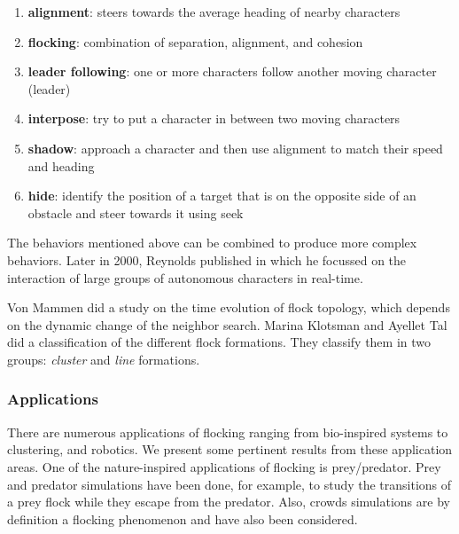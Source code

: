 \begin{enumerate}
\item \textbf{alignment}: steers towards the average heading of nearby characters
\item \textbf{flocking}: combination of separation, alignment, and cohesion
\item \textbf{leader following}: one or more characters follow another moving character (leader)
\item \textbf{interpose}: try to put a character in between two moving characters
\item \textbf{shadow}: approach a character and then use alignment to match their speed and heading
\item \textbf{hide}: identify the position of a target that is on the opposite side of an obstacle and  steer towards it using seek
\end{enumerate} 
 
The behaviors mentioned above can be combined to produce more complex behaviors. Later in 2000, Reynolds published \cite{craigInteractionGroups} in which he focussed on the interaction of large groups of autonomous characters in real-time. 

Von Mammen did a study on the time evolution of flock topology, which depends on the dynamic change of the neighbor search\cite{spatialSwarms}. Marina Klotsman and Ayellet Tal  did a classification of the different flock formations\cite{lineFormations}. They classify them in two groups: \textit{cluster} and \textit{line} formations.


\subsubsection{Applications}
There are numerous applications of flocking ranging from bio-inspired systems to clustering, and robotics. We present some pertinent results from these application areas. One of the nature-inspired applications of flocking is prey/predator\cite{gems2}. Prey and predator simulations have been done, for example, to study the transitions of a prey flock while they escape from the predator\cite{preyFlock}. Also, crowds simulations are by definition a flocking phenomenon and have also been considered\cite{crowdsPS3}. 

